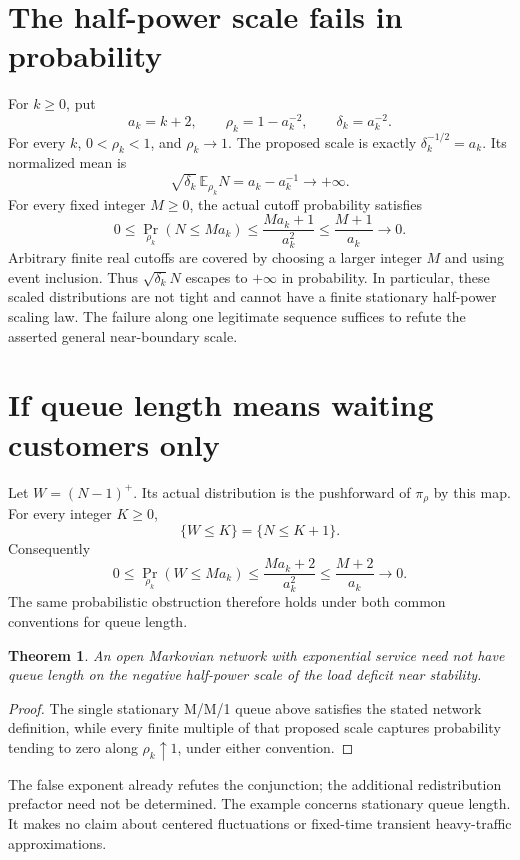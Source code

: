 \documentclass[11pt]{article}
\newtheorem{theorem}{Theorem}
\begin{document}
\section*{The half-power scale fails in probability}
For $k\geq0$, put
\[
 a_k=k+2,\qquad \rho_k=1-a_k^{-2},\qquad
 \delta_k=a_k^{-2}.
\]
For every $k$, $0<\rho_k<1$, and $\rho_k\to1$.
The proposed scale is exactly
$\delta_k^{-1/2}=a_k$. Its normalized mean is
\[
       \sqrt{\delta_k}\,\mathbb E_{\rho_k}N
              =a_k-a_k^{-1}\longrightarrow+\infty.
\]
For every fixed integer $M\geq0$, the actual cutoff
probability satisfies
\[
 0\leq\Pr_{\rho_k}(N\leq M a_k)
       \leq\frac{M a_k+1}{a_k^2}
       \leq\frac{M+1}{a_k}\longrightarrow0.
\]
Arbitrary finite real cutoffs are covered by choosing
a larger integer $M$ and using event inclusion.
Thus $\sqrt{\delta_k}N$ escapes to $+\infty$ in
probability. In particular, these scaled distributions
are not tight and cannot have a finite stationary
half-power scaling law. The failure along one legitimate
sequence suffices to refute the asserted general
near-boundary scale.

\section*{If queue length means waiting customers only}
Let $W=(N-1)^+$. Its actual distribution is the pushforward
of $\pi_\rho$ by this map. For every integer $K\geq0$,
\[
        \{W\leq K\}=\{N\leq K+1\}.
\]
Consequently
\[
 0\leq\Pr_{\rho_k}(W\leq M a_k)
    \leq\frac{M a_k+2}{a_k^2}
    \leq\frac{M+2}{a_k}\longrightarrow0.
\]
The same probabilistic obstruction therefore holds under
both common conventions for queue length.

\begin{theorem}
An open Markovian network with exponential service need
not have queue length on the negative half-power scale
of the load deficit near stability.
\end{theorem}
\begin{proof}
The single stationary M/M/1 queue above satisfies the
stated network definition, while every finite multiple
of that proposed scale captures probability tending to
zero along $\rho_k\uparrow1$, under either convention.
\end{proof}
The false exponent already refutes the conjunction;
the additional redistribution prefactor need not be
determined. The example concerns stationary queue length.
It makes no claim about centered fluctuations or
fixed-time transient heavy-traffic approximations.
\end{document}
